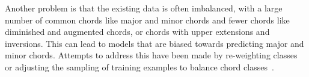 Another problem is that the existing data is often imbalanced, with a large number of common chords like major and minor chords and fewer chords like diminished and augmented chords, or chords with upper extensions and inversions. This can lead to models that are biased towards predicting major and minor chords. Attempts to address this have been made by re-weighting classes~\citep{ACRLargeVocab1} or adjusting the sampling of training examples to balance chord classes~\citep{BalanceRandomForestACR}.
